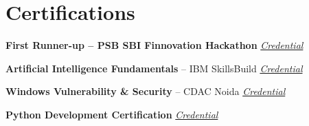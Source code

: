 \documentclass[a4paper,11pt]{article}
\begin{document}
\vspace{-4mm}


\section{Certifications}

\begin{itemize}[leftmargin=0.05in,itemsep=1.5mm]

\small{

\item{
\textbf{First Runner-up -- PSB SBI Finnovation Hackathon} \hfill \href{https://anoonimouse.github.io/myresume/sbi_finnovation_26_rotated.pdf}{\textit{Credential}}
}

\item{
\textbf{Artificial Intelligence Fundamentals} -- IBM SkillsBuild \hfill \href{https://www.credly.com/badges/8ba0a78d-a8ae-420f-be36-503a01232c32/public_url}{\textit{Credential}}
}

\item{
\textbf{Windows Vulnerability \& Security} -- CDAC Noida \hfill \href{https://anoonimouse.github.io/myresume/cdac_certificate.pdf}{\textit{Credential}}
}

\item{
\textbf{Python Development Certification} \hfill \href{https://anoonimouse.github.io/myresume/python_certificate.pdf}{\textit{Credential}}
}

}

\end{itemize}

\end{document}
